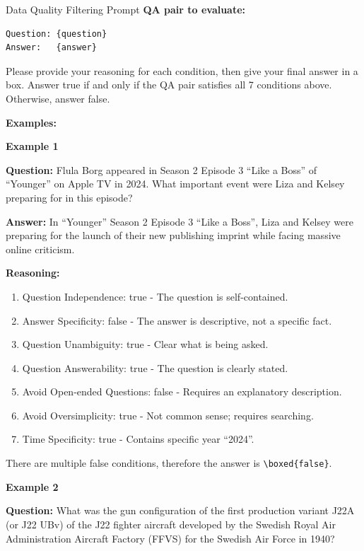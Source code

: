 \documentclass{article} %
\theoremstyle{plain}
\theoremstyle{definition}
\theoremstyle{remark}
\begin{document}
\begin{promptbox}{Data Quality Filtering Prompt}
\textbf{QA pair to evaluate:}
\begin{lstlisting}[basicstyle=\ttfamily\footnotesize,breaklines=true]
Question: {question}
Answer:   {answer}
\end{lstlisting}

Please provide your reasoning for each condition, then give your final answer in a box. Answer true if and only if the QA pair satisfies all 7 conditions above. Otherwise, answer false.

\textbf{Examples:}

\noindent\hrulefill

\textbf{Example 1}

\textbf{Question:} Flula Borg appeared in Season 2 Episode 3 ``Like a Boss'' of ``Younger'' on Apple TV in 2024. What important event were Liza and Kelsey preparing for in this episode?

\textbf{Answer:} In ``Younger'' Season 2 Episode 3 ``Like a Boss'', Liza and Kelsey were preparing for the launch of their new publishing imprint while facing massive online criticism.

\textbf{Reasoning:}
\begin{enumerate}[label=\arabic*.]
    \item Question Independence: true - The question is self-contained.
    \item Answer Specificity: false - The answer is descriptive, not a specific fact.
    \item Question Unambiguity: true - Clear what is being asked.
    \item Question Answerability: true - The question is clearly stated.
    \item Avoid Open-ended Questions: false - Requires an explanatory description.
    \item Avoid Oversimplicity: true - Not common sense; requires searching.
    \item Time Specificity: true - Contains specific year ``2024''.
\end{enumerate}
There are multiple false conditions, therefore the answer is \texttt{\textbackslash boxed\{false\}}.

\noindent\hrulefill

\textbf{Example 2}

\textbf{Question:} What was the gun configuration of the first production variant J22A (or J22 UBv) of the J22 fighter aircraft developed by the Swedish Royal Air Administration Aircraft Factory (FFVS) for the Swedish Air Force in 1940?


\end{promptbox}
\end{document}
